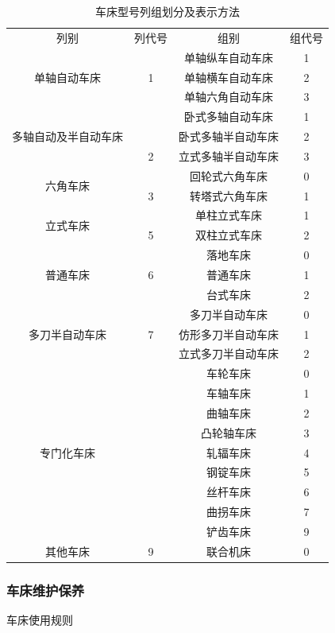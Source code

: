 \documentclass{ctexbook}
\begin{document}
\begin{table}[htbp]
	\centering
	\caption{车床型号列组划分及表示方法}
	\begin{tabular}{cccc}
		列别    & 列代号   & 组别    & 组代号 \\
		\multirow{3}[0]{*}{单轴自动车床} &       & 单轴纵车自动车床 & 1 \\
		& 1     & 单轴横车自动车床 & 2 \\
		&       & 单轴六角自动车床 & 3 \\
		\multirow{3}[0]{*}{多轴自动及半自动车床} &       & 卧式多轴自动车床 & 1 \\
		&       & 卧式多轴半自动车床 & 2 \\
		& 2     & 立式多轴半自动车床 & 3 \\
		\multirow{2}[0]{*}{六角车床} &       & 回轮式六角车床 & 0 \\
		& 3     & 转塔式六角车床 & 1 \\
		\multirow{2}[0]{*}{立式车床} &       & 单柱立式车床 & 1 \\
		& 5     & 双柱立式车床 & 2 \\
		\multirow{3}[0]{*}{普通车床} &       & 落地车床  & 0 \\
		& 6     & 普通车床  & 1 \\
		&       & 台式车床  & 2 \\
		\multirow{3}[0]{*}{多刀半自动车床} &       & 多刀半自动车床 & 0 \\
		& 7     & 仿形多刀半自动车床 & 1 \\
		&       & 立式多刀半自动车床 & 2 \\
		\multirow{9}[0]{*}{专门化车床} &       & 车轮车床  & 0 \\
		&       & 车轴车床  & 1 \\
		&       & 曲轴车床  & 2 \\
		&       & 凸轮轴车床 & 3 \\
		&       & 轧辐车床  & 4 \\
		&       & 钢锭车床  & 5 \\
		&       & 丝杆车床  & 6 \\
		&       & 曲拐车床  & 7 \\
		&       & 铲齿车床  & 9 \\
		其他车床  & 9     & 联合机床  & 0 \\
	\end{tabular}%
	\label{tab:chechuangliezu}%
\end{table}%
\subsubsection{车床维护保养}
车床使用规则
\end{document}
